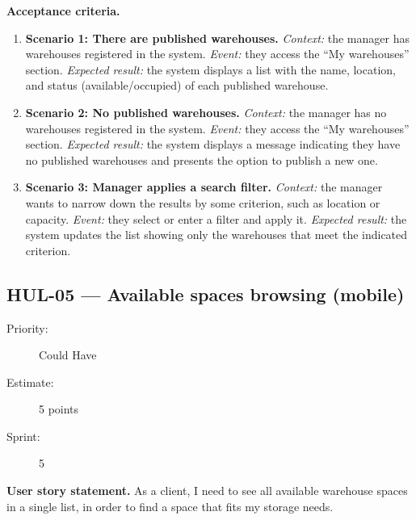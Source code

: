 \documentclass[11pt,a4paper,oneside]{report}
\begin{document}
\textbf{Acceptance criteria.}
\begin{enumerate}
\item \textbf{Scenario 1: There are published warehouses.} \emph{Context:} the manager has warehouses registered in the system. \emph{Event:} they access the ``My warehouses'' section. \emph{Expected result:} the system displays a list with the name, location, and status (available/occupied) of each published warehouse.
\item \textbf{Scenario 2: No published warehouses.} \emph{Context:} the manager has no warehouses registered in the system. \emph{Event:} they access the ``My warehouses'' section. \emph{Expected result:} the system displays a message indicating they have no published warehouses and presents the option to publish a new one.
\item \textbf{Scenario 3: Manager applies a search filter.} \emph{Context:} the manager wants to narrow down the results by some criterion, such as location or capacity. \emph{Event:} they select or enter a filter and apply it. \emph{Expected result:} the system updates the list showing only the warehouses that meet the indicated criterion.
\end{enumerate}

\subsection{HUL-05 --- Available spaces browsing (mobile)}
\label{req:HUL-05}
\begin{description}
\item[Priority:] Could Have \quad \item[Estimate:] 5 points \quad \item[Sprint:] 5
\end{description}

\textbf{User story statement.} As a client, I need to see all available warehouse spaces in a single list, in order to find a space that fits my storage needs.
\end{document}

